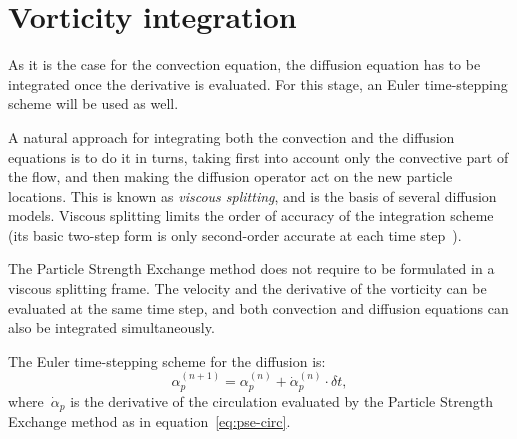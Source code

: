 \section{Vorticity integration}
\label{sec:vorticity-integration}

As it is the case for the convection equation,
the diffusion equation has to be integrated
once the derivative is evaluated.
For this stage,
an Euler time-stepping scheme will be used as well.

A natural approach for integrating both the convection and the diffusion equations
is to do it in turns, taking first into account only the convective part of the flow,
and then making the diffusion operator act on the new particle locations.
This is known as \emph{viscous splitting},
and is the basis of several diffusion models.
Viscous splitting limits the order of accuracy of the integration scheme
(its basic two-step form is only second-order accurate
at each time step~\cite[\S2.1.1]{barba04}).

The Particle Strength Exchange method
does not require to be formulated
in a viscous splitting frame.
The velocity and the derivative of the vorticity
can be evaluated at the same time step,
and both convection and diffusion equations
can also be integrated simultaneously.

The Euler time-stepping scheme for the diffusion is:
\begin{equation}
  \label{eq:euler-diffusion}
  α_p^{(n + 1)} = α_p^{(n)} + \dot{α}_p^{(n)}\cdot δt,
\end{equation}
where~\(\dot{α}_p\) is the derivative of the circulation
evaluated by the Particle Strength Exchange method
as in equation~\eqref{eq:pse-circ}.

